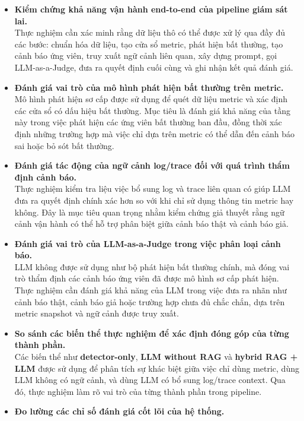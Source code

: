 \begin{itemize}[label=--]
    \item \textbf{Kiểm chứng khả năng vận hành end-to-end của pipeline giám sát lai.}\\
Thực nghiệm cần xác minh rằng dữ liệu thô có thể được xử lý qua đầy đủ các bước: chuẩn hóa dữ liệu, tạo cửa sổ metric, phát hiện bất thường, tạo cảnh báo ứng viên, truy xuất ngữ cảnh liên quan, xây dựng prompt, gọi LLM-as-a-Judge, đưa ra quyết định cuối cùng và ghi nhận kết quả đánh giá.
    \item \textbf{Đánh giá vai trò của mô hình phát hiện bất thường trên metric.}\\
Mô hình phát hiện sơ cấp được sử dụng để quét dữ liệu metric và xác định các cửa sổ có dấu hiệu bất thường. Mục tiêu là đánh giá khả năng của tầng này trong việc phát hiện các ứng viên bất thường ban đầu, đồng thời xác định những trường hợp mà việc chỉ dựa trên metric có thể dẫn đến cảnh báo sai hoặc bỏ sót bất thường.
    \item \textbf{Đánh giá tác động của ngữ cảnh log/trace đối với quá trình thẩm định cảnh báo.}\\
Thực nghiệm kiểm tra liệu việc bổ sung log và trace liên quan có giúp LLM đưa ra quyết định chính xác hơn so với khi chỉ sử dụng thông tin metric hay không. Đây là mục tiêu quan trọng nhằm kiểm chứng giả thuyết rằng ngữ cảnh vận hành có thể hỗ trợ phân biệt giữa cảnh báo thật và cảnh báo giả.
    \item \textbf{Đánh giá vai trò của LLM-as-a-Judge trong việc phân loại cảnh báo.}\\
LLM không được sử dụng như bộ phát hiện bất thường chính, mà đóng vai trò thẩm định các cảnh báo ứng viên đã được mô hình sơ cấp phát hiện. Thực nghiệm cần đánh giá khả năng của LLM trong việc đưa ra nhãn như cảnh báo thật, cảnh báo giả hoặc trường hợp chưa đủ chắc chắn, dựa trên metric snapshot và ngữ cảnh được truy xuất.
    \item \textbf{So sánh các biến thể thực nghiệm để xác định đóng góp của từng thành phần.}\\
Các biến thể như \textbf{detector-only}, \textbf{LLM without RAG} và\textbf{ hybrid RAG + LLM} được sử dụng để phân tích sự khác biệt giữa việc chỉ dùng metric, dùng LLM không có ngữ cảnh, và dùng LLM có bổ sung log/trace context. Qua đó, thực nghiệm làm rõ vai trò của từng thành phần trong pipeline.
    \item \textbf{Đo lường các chỉ số đánh giá cốt lõi của hệ thống.}\\

\end{itemize}
